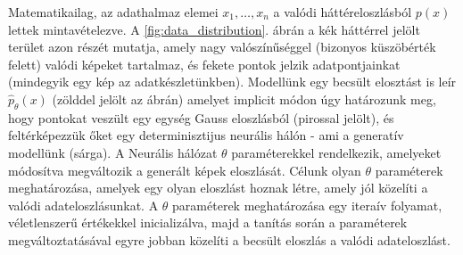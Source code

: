 




Matematikailag, az adathalmaz elemei $x_1, \dots, x_n$ a valódi háttéreloszlásból $p(x)$ lettek mintavételezve. A \ref{fig:data_distribution}. ábrán a kék háttérrel jelölt terület azon részét mutatja, amely nagy valószínűséggel (bizonyos küszöbérték felett) valódi képeket tartalmaz, és fekete pontok jelzik adatpontjainkat (mindegyik egy kép az adatkészletünkben). Modellünk egy becsült elosztást is leír $\hat{p}_{\theta}(x)$ (zölddel jelölt az ábrán) amelyet implicit módon úgy határozunk meg, hogy pontokat veszült egy egység Gauss eloszlásból (pirossal jelölt), és feltérképezzük őket egy determinisztijus neurális hálón - ami a generatív modellünk (sárga). A Neurális hálózat $\theta$ paraméterekkel rendelkezik, amelyeket módosítva megváltozik a generált képek eloszlását. Célunk olyan $\theta$ paraméterek meghatározása, amelyek egy olyan eloszlást hoznak létre, amely jól közelíti a valódi adateloszlásunkat. A $\theta$ paraméterek meghatározása egy iteraív folyamat, véletlenszerű értékekkel inicializálva, majd a tanítás során a paraméterek megváltoztatásával egyre jobban közelíti a becsült eloszlás a valódi adateloszlást.

